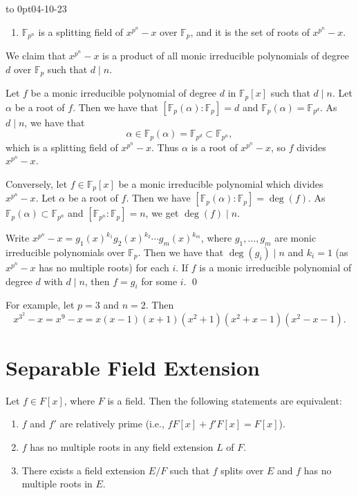 \documentclass[twoside]{article}
\newcommand\F{\mathbb F}
\theoremstyle{remark}
\newcommand*\newclass[1]{\par\vbox to 0pt{\hbox{\tiny\sffamily\color{gray}#1}} \par\ignorespaces}
\begin{document}
\begin{examples}
  \newclass{04-10-23}
  \begin{enumerate}[resume*]
    \item \(\F_{p^n}\) is a splitting field of \(x^{p^n}-x\) over \(\F_p\), and it is the set of roots of \(x^{p^n}-x\).
  \end{enumerate}
  We claim that \(x^{p^n}-x\) is a product of all monic irreducible polynomials of degree \(d\) over \(\F_p\) such that \(d \mid n\).
  
  Let \(f\) be a monic irreducible polynomial of degree \(d\) in \(\F_p[x]\) such that \(d \mid n\). Let \(\alpha\) be a root of \(f\). Then we have that \([\F_p(\alpha):\F_p] = d\) and \(\F_p(\alpha) = \F_{p^d}\). As \(d \mid n\), we have that
  \[ \alpha \in \F_p(\alpha) = \F_{p^d} \subset \F_{p^n}, \]
  which is a splitting field of \(x^{p^n}-x\). Thus \(\alpha\) is a root of \(x^{p^n}-x\), so \(f\) divides \(x^{p^n}-x\).
  
  Conversely, let \(f \in \F_p[x]\) be a monic irreducible polynomial which divides \(x^{p^n}-x\). Let \(\alpha\) be a root of \(f\). Then we have \([\F_p(\alpha):\F_p] = \deg(f)\). As \(\F_p(\alpha) \subset \F_{p^n}\) and \([\F_{p^n}:\F_p] = n\), we get \(\deg(f) \mid n\).
  
  Write \(x^{p^n}-x = g_1(x)^{k_1} g_2(x)^{k_2} \cdots g_m(x)^{k_m}\), where \(g_1, \dots, g_m\) are monic irreducible polynomials over \(\F_p\). Then we have that \(\deg(g_i) \mid n\) and \(k_i = 1\) (as \(x^{p^n}-x\) has no multiple roots) for each \(i\). If \(f\) is a monic irreducible polynomial of degree \(d\) with \(d \mid n\), then \(f = g_i\) for some \(i\). \qed
  
  For example, let \(p=3\) and \(n=2\). Then
  \[ x^{3^2}-x = x^9 - x = x(x-1)(x+1)(x^2+1)(x^2+x-1)(x^2-x-1). \]
\end{examples}

\bigskip

\section{Separable Field Extension}

\begin{lemma} \label{lem:separable}
  Let \(f \in F[x]\), where \(F\) is a field. Then the following statements are equivalent:
  \begin{enumerate}[label=\textup{(\arabic*)},nosep]
    \item \(f\) and \(f'\) are relatively prime (i.e., \(f F[x] + f' F[x] = F[x]\)).
    \item \(f\) has no multiple roots in any field extension \(L\) of \(F\).
    \item There exists a field extension \(E/F\) such that \(f\) splits over \(E\) and \(f\) has no multiple roots in \(E\).
  \end{enumerate}
\end{lemma}
\end{document}
